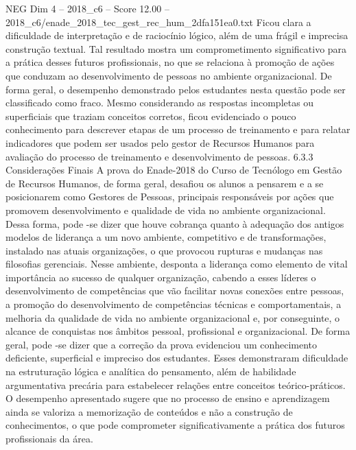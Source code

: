 \begin{textsample}{NEG Dim 4 – 2018\_c6 – Score 12.00 – 2018\_c6/enade\_2018\_tec\_gest\_rec\_hum\_2dfa151ea0.txt}
Ficou clara a dificuldade de interpretação e de raciocínio lógico, além de uma frágil e imprecisa construção textual.
Tal resultado mostra um comprometimento significativo para a prática desses futuros profissionais, no que se relaciona à promoção de ações que conduzam ao desenvolvimento de pessoas no ambiente organizacional.
De forma geral, o desempenho demonstrado pelos estudantes nesta questão pode ser classificado como fraco.
Mesmo considerando as respostas incompletas ou superficiais que traziam conceitos corretos, ficou evidenciado o pouco conhecimento para descrever etapas de um processo de treinamento e para relatar indicadores que podem ser usados pelo gestor de Recursos Humanos para avaliação do processo de treinamento e desenvolvimento de pessoas. 6.3.3 Considerações Finais A prova do Enade-2018 do Curso de Tecnólogo em Gestão de Recursos Humanos, de forma geral, desafiou os alunos a pensarem e a se posicionarem como Gestores de Pessoas, principais responsáveis por ações que promovem desenvolvimento e qualidade de vida no ambiente organizacional.
Dessa forma, pode -se dizer que houve cobrança quanto à adequação dos antigos modelos de liderança a um novo ambiente, competitivo e de transformações, instalado nas atuais organizações, o que provocou rupturas e mudanças nas filosofias gerenciais.
Nesse ambiente, desponta a liderança como elemento de vital importância ao sucesso de qualquer organização, cabendo a esses líderes o desenvolvimento de competências que vão facilitar novas conexões entre pessoas, a promoção do desenvolvimento de competências técnicas e comportamentais, a melhoria da qualidade de vida no ambiente organizacional e, por conseguinte, o alcance de conquistas nos âmbitos pessoal, profissional e organizacional.
De forma geral, pode -se dizer que a correção da prova evidenciou um conhecimento deficiente, superficial e impreciso dos estudantes.
Esses demonstraram dificuldade na estruturação lógica e analítica do pensamento, além de habilidade argumentativa precária para estabelecer relações entre conceitos teórico-práticos.
O desempenho apresentado sugere que no processo de ensino e aprendizagem ainda se valoriza a memorização de conteúdos e não a construção de conhecimentos, o que pode comprometer significativamente a prática dos futuros profissionais da área.

\end{textsample}
